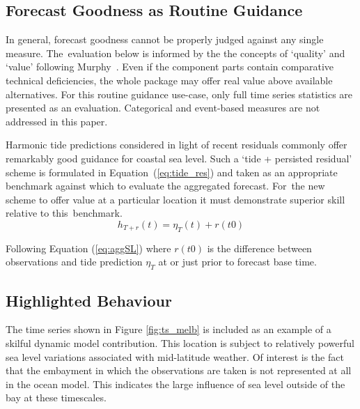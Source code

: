 \subsection{Forecast Goodness as Routine Guidance}
In general, forecast goodness cannot be properly judged against any single measure.
The~evaluation below is informed by the the concepts of `quality' and `value' following Murphy~\cite{Murphy:1993dh}.
Even if the component parts contain comparative technical deficiencies, the whole package may offer real value above available alternatives.
For this routine guidance use-case, only full time series statistics are presented as an evaluation. 
Categorical and event-based measures are not addressed in this paper.


Harmonic tide predictions considered in light of recent residuals commonly offer remarkably good guidance for coastal sea level.
Such a `tide + persisted residual' scheme is formulated in Equation~(\ref{eq:tide_res}) and taken as an appropriate benchmark against which to evaluate the aggregated forecast.
For~the new scheme to offer value at a particular location it must demonstrate superior skill relative to this~benchmark.  
\begin{equation}
h_{T+r}(t) = \eta_{T}(t) + r(t0)
\label{eq:tide_res}
\end{equation}

Following Equation (\ref{eq:aggSL}) where $r(t0)$ is the difference between observations and tide prediction $\eta_{T}$ at or just prior to forecast base time. 

\subsection{Highlighted Behaviour}
The time series shown in Figure \ref{fig:ts_melb} is included as an example of a skilful dynamic model contribution.  
This location is subject to relatively powerful sea level variations associated with mid-latitude weather.
Of interest is the fact that the embayment in which the observations are taken is not represented at all in the ocean model.  This indicates the large influence of sea level outside of the bay at these timescales. 

